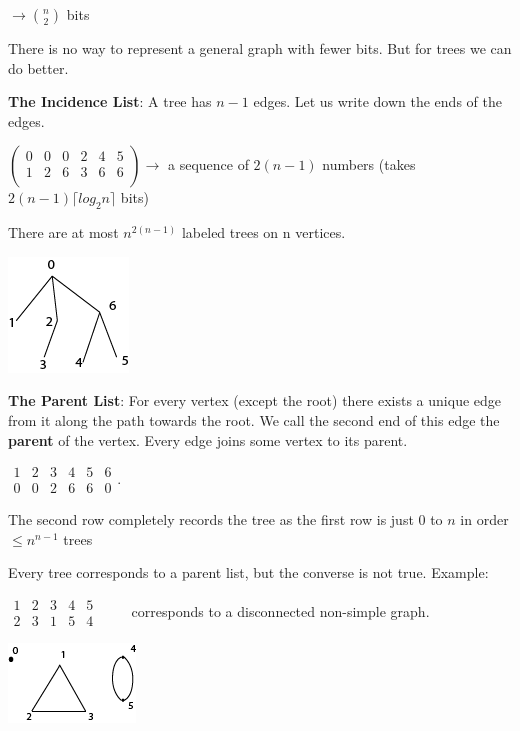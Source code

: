\documentclass[9pt, letterpaper, oneside]{article}
\begin{document}
$\to {n \choose 2}$ bits

There is no way to represent a general graph with fewer bits. But for trees we can do better. 

\textbf{The Incidence List}: A tree has $n-1$ edges. Let us write down the ends of the edges.

$
\begin{pmatrix}
0 & 0 & 0 & 2 & 4 & 5 \\
1 & 2 & 6 & 3 & 6 & 6 \\
\end{pmatrix}
\to$
a sequence of $2(n-1)$ numbers (takes $2(n-1)\lceil log_2 n \rceil$ bits)

There are at most $n^{2(n-1)}$ labeled trees on n vertices.

\includegraphics{fig2.png}

\textbf{The Parent List}:  For every vertex (except the root) there exists a unique edge from it along the path towards the root. 
We call the second end of this edge the \textbf{parent} of the vertex. 
Every edge joins some vertex to its parent.

$\begin{matrix}1 & 2 & 3 & 4 & 5 & 6 \\0 & 0 & 2 & 6 & 6 & 0\end{matrix}$.

The second row completely records the tree as the first row is just $0$ to $n$ in order $\leq n^{n-1}$ trees

Every tree corresponds to a parent list, but the converse is not true. Example:

$\begin{matrix} 1 & 2 & 3 & 4 & 5 \\2 & 3 & 1 & 5 & 4 \end{matrix}\qquad$ corresponds to a disconnected non-simple graph.

\includegraphics{fig3.png}
\end{document}
